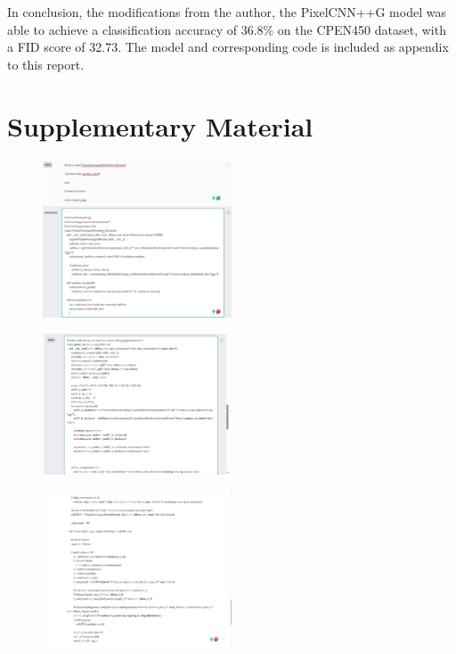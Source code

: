 \documentclass{article}
\begin{document}
In conclusion, the modifications from the author, the PixelCNN++G model was able to achieve a classification accuracy of 36.8\% on the CPEN450 dataset, with a FID score of 32.73. The model and corresponding code is included as appendix to this report.


\section{Supplementary Material}

\begin{figure}[H]
    \centering
    \includegraphics[width=0.5\textwidth]{report_data/g-1.png}
\end{figure}

\begin{figure}[H]
    \centering
    \includegraphics[width=0.5\textwidth]{report_data/g-2.png}
\end{figure}

\begin{figure}[H]
    \centering
    \includegraphics[width=0.5\textwidth]{report_data/g-3.png}

\end{figure}
\end{document}
